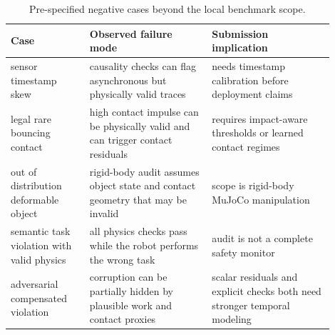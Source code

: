 \begin{table}[t]
\centering
\caption{Pre-specified negative cases beyond the local benchmark scope.}
\label{tab:negative-cases}
\scriptsize
\begin{tabular}{p{0.22\linewidth}p{0.34\linewidth}p{0.34\linewidth}}
\toprule
Case & Observed failure mode & Submission implication \\
\midrule
sensor timestamp skew & causality checks can flag asynchronous but physically valid traces & needs timestamp calibration before deployment claims \\
legal rare bouncing contact & high contact impulse can be physically valid and can trigger contact residuals & requires impact-aware thresholds or learned contact regimes \\
out of distribution deformable object & rigid-body audit assumes object state and contact geometry that may be invalid & scope is rigid-body MuJoCo manipulation \\
semantic task violation with valid physics & all physics checks pass while the robot performs the wrong task & audit is not a complete safety monitor \\
adversarial compensated violation & corruption can be partially hidden by plausible work and contact proxies & scalar residuals and explicit checks both need stronger temporal modeling \\
\bottomrule
\end{tabular}
\end{table}
